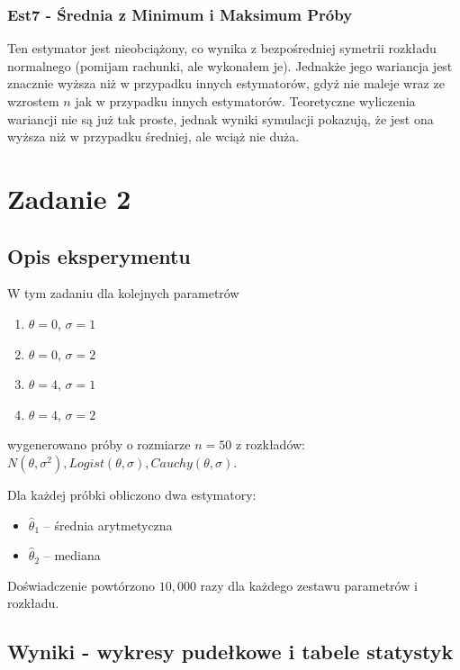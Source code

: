 \documentclass[a4paper,12pt]{article}
\begin{document}
\subsubsection{Est7 - Średnia z Minimum i Maksimum Próby}
Ten estymator jest nieobciążony, co wynika z bezpośredniej symetrii rozkładu normalnego (pomijam rachunki, ale wykonałem je).
Jednakże jego wariancja jest znacznie wyższa niż w przypadku innych estymatorów, gdyż nie maleje wraz ze wzrostem $n$ jak w przypadku innych estymatorów.
Teoretyczne wyliczenia wariancji nie są już tak proste, jednak wyniki symulacji pokazują, że jest ona wyższa niż w przypadku średniej, ale wciąż nie duża.

\section{Zadanie 2}

\subsection{Opis eksperymentu}
W tym zadaniu dla kolejnych parametrów

\begin{enumerate}
    \item $\theta = 0$, $\sigma = 1$
    \item $\theta = 0$, $\sigma = 2$
    \item $\theta = 4$, $\sigma = 1$
    \item $\theta = 4$, $\sigma = 2$
\end{enumerate}

wygenerowano próby o rozmiarze $n=50$ z rozkładów: $ N(\theta, \sigma^2), Logist(\theta, \sigma), Cauchy(\theta, \sigma)$.

Dla każdej próbki obliczono dwa estymatory:

\begin{itemize}
    \item $\hat{\theta}_1$ -- średnia arytmetyczna
    \item $\hat{\theta}_2$ -- mediana
\end{itemize}

Doświadczenie powtórzono $10{,}000$ razy dla każdego zestawu parametrów i rozkładu.

\newpage

\subsection{Wyniki - wykresy pudełkowe i tabele statystyk}
\end{document}
